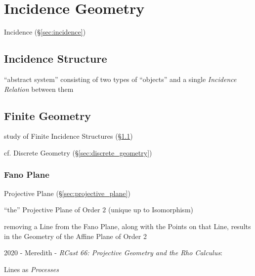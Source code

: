 \section{Incidence Geometry}\label{sec:incidence_geometry}

Incidence (\S\ref{sec:incidence})



\subsection{Incidence Structure}\label{sec:incidence_structure}

``abstract system'' consisting of two types of ``objects'' and a single
\emph{Incidence Relation} between them



\subsection{Finite Geometry}\label{sec:finite_geometry}

study of Finite Incidence Structures (\S\ref{sec:incidence_structure})

cf. Discrete Geometry (\S\ref{sec:discrete_geometry})



\subsubsection{Fano Plane}\label{sec:fano_plane}

Projective Plane (\S\ref{sec:projective_plane})

``the'' Projective Plane of Order $2$ (unique up to Isomorphism)

removing a Line from the Fano Plane, along with the Points on that Line, results
in the Geometry of the Affine Plane of Order 2

2020 - Meredith - \emph{RCast 66: Projective Geometry and the Rho Calculus}:

Lines as \emph{Processes}

